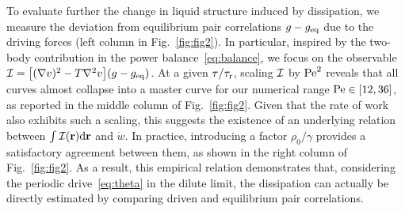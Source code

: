 \documentclass[superscriptaddress, twocolumn, prx, longbibliography, nofootinbib]{revtex4-1}
\begin{document}
To evaluate further the change in liquid structure induced by dissipation, we measure the deviation from equilibrium pair correlations $g-g_{\rm eq}$ due to the driving forces (left column in Fig.~\ref{fig:fig2}). In particular, inspired by the two-body contribution in the power balance~\eqref{eq:balance}, we focus on the observable ${\cal I} = \big[(\nabla v)^2-T\nabla^2v\big](g - g_{\rm eq})$.  At a given $\tau/\tau_{\rm r}$, scaling ${\cal I}$ by ${\rm Pe}^2$ reveals that all curves almost collapse into a master curve for our numerical range ${\rm Pe}\in[12,36]$, as reported in the middle column of Fig.~\ref{fig:fig2}. Given that the rate of work also exhibits such a scaling, this suggests the existence of an underlying relation between $\int{\cal I}({\bf r}){\rm d}{\bf r}$ and $\dot w$. In practice, introducing a factor $\rho_0/\gamma$ provides a satisfactory agreement between them, as shown in the right column of Fig.~\ref{fig:fig2}. As a result, this empirical relation demonstrates that, considering the periodic drive~\eqref{eq:theta} in the dilute limit, the dissipation can actually be directly estimated by comparing driven and equilibrium pair correlations.

\end{document}
